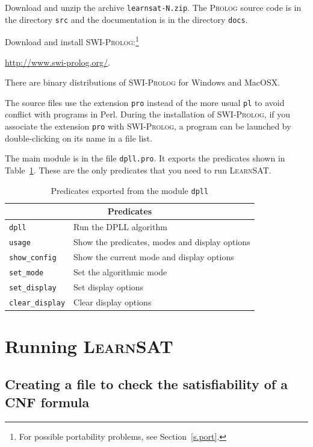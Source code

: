 \documentclass[11pt]{report}
\newcommand*{\p}[1]{\textup{\texttt{#1}}}
\newcommand*{\ls}{\textsc{LearnSAT}}
\newcommand*{\pl}{\textsc{Prolog}}
\newcommand*{\sw}{\textsc{SWI-Prolog}}
\begin{document}
Download and unzip the archive \p{learnsat-N.zip}. The \pl{} source code
is in the directory \p{src} and the documentation is in the directory
\p{docs}.

Download and install \sw{}:\footnote{For possible portability problems,
see Section~\ref{s.port}.}
\begin{center}
\url{http://www.swi-prolog.org/}.
\end{center}
There are binary distributions of \sw{} for Windows and MacOSX.

The source files use the extension \p{pro} instead of the more usual
\p{pl} to avoid conflict with programs in Perl. During the installation
of \sw{}, if you associate the extension \p{pro} with \sw{}, a
program can be launched by double-clicking on its name in a file list. 

The main module is in the file \p{dpll.pro}. It exports the predicates
shown in Table~\ref{tab.export}. These are the only predicates that you
need to run \ls{}.

\begin{table}
\begin{center}
\begin{tabular}{|l|l|}
\hline
\multicolumn{2}{|c|}{\textbf{\large Predicates}}\\
\hline
\p{dpll}&Run the DPLL algorithm\\
\p{usage}&Show the predicates, modes and display options \\
\p{show\_config}&Show the current mode and display options\\
\p{set\_mode}&Set the algorithmic mode\\
\p{set\_display}&Set display options\\
\p{clear\_display}&Clear display options\\
\hline
\end{tabular}
\end{center}
\caption{Predicates exported from the module \p{dpll}}\label{tab.export}
\end{table}


\section{Running \ls}

\subsection{Creating a file to check the satisfiability of a CNF formula}
\end{document}
